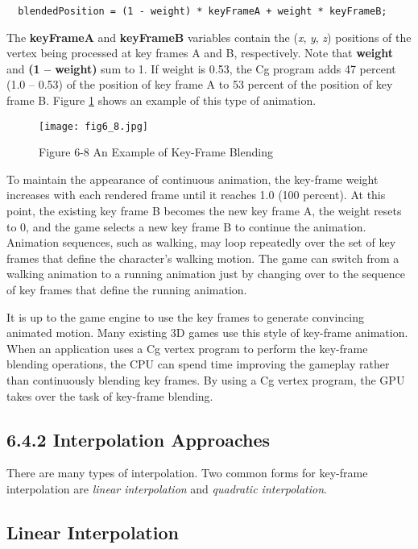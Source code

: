 \documentclass[../main.tex]{subfiles}
\begin{document}
\FloatBarrier
\begin{lstlisting}
  blendedPosition = (1 - weight) * keyFrameA + weight * keyFrameB;
\end{lstlisting}
\FloatBarrier

The \textbf{keyFrameA} and \textbf{keyFrameB} variables contain the (\textit{x}, \textit{y}, \textit{z}) positions of the vertex being processed at key frames A and B, respectively. Note that \textbf{weight} and \textbf{(1 – weight)} sum to 1. If weight is 0.53, the Cg program adds 47 percent (1.0 – 0.53) of the position of key frame A to 53 percent of the position of key frame B. Figure \ref{fig:6-8} shows an example of this type of animation.

\begin{figure}
    \centering
    \texttt{[image: fig6\_8.jpg]}
    \caption{Figure 6-8 An Example of Key-Frame Blending}
    \label{fig:6-8}
\end{figure}

To maintain the appearance of continuous animation, the key-frame weight increases with each rendered frame until it reaches 1.0 (100 percent). At this point, the existing key frame B becomes the new key frame A, the weight resets to 0, and the game selects a new key frame B to continue the animation. Animation sequences, such as walking, may loop repeatedly over the set of key frames that define the character's walking motion. The game can switch from a walking animation to a running animation just by changing over to the sequence of key frames that define the running animation.

It is up to the game engine to use the key frames to generate convincing animated motion. Many existing 3D games use this style of key-frame animation. When an application uses a Cg vertex program to perform the key-frame blending operations, the CPU can spend time improving the gameplay rather than continuously blending key frames. By using a Cg vertex program, the GPU takes over the task of key-frame blending.

\subsection{6.4.2 Interpolation Approaches}

There are many types of interpolation. Two common forms for key-frame interpolation are \textit{linear interpolation} and \textit{quadratic interpolation}.

\subsection*{Linear Interpolation}
\end{document}
